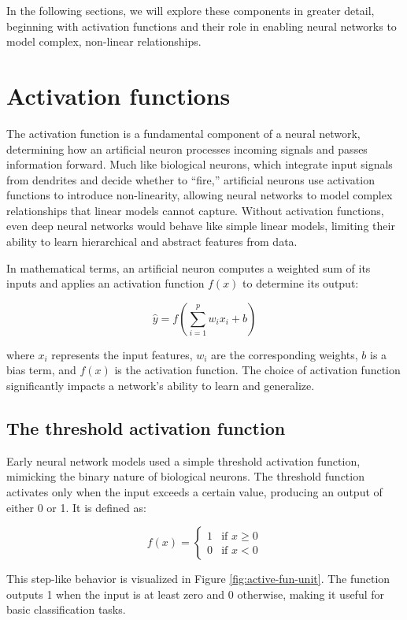 \documentclass[
  11pt,
]{book}
\theoremstyle{definition}
\theoremstyle{definition}
\theoremstyle{definition}
\theoremstyle{definition}
\theoremstyle{remark}
\begin{document}
In the following sections, we will explore these components in greater detail, beginning with activation functions and their role in enabling neural networks to model complex, non-linear relationships.

\section{Activation functions}\label{activation-functions}

The activation function is a fundamental component of a neural network, determining how an artificial neuron processes incoming signals and passes information forward. Much like biological neurons, which integrate input signals from dendrites and decide whether to ``fire,'' artificial neurons use activation functions to introduce non-linearity, allowing neural networks to model complex relationships that linear models cannot capture. Without activation functions, even deep neural networks would behave like simple linear models, limiting their ability to learn hierarchical and abstract features from data.

In mathematical terms, an artificial neuron computes a weighted sum of its inputs and applies an activation function \(f(x)\) to determine its output:

\[
\hat{y} = f\left( \sum_{i=1}^{p} w_i x_i + b \right)
\]

where \(x_i\) represents the input features, \(w_i\) are the corresponding weights, \(b\) is a bias term, and \(f(x)\) is the activation function. The choice of activation function significantly impacts a network's ability to learn and generalize.

\subsection*{The threshold activation function}\label{the-threshold-activation-function}


Early neural network models used a simple threshold activation function, mimicking the binary nature of biological neurons. The threshold function activates only when the input exceeds a certain value, producing an output of either 0 or 1. It is defined as:

\[
f(x) = 
\begin{cases} 
1 & \text{if } x \geq 0 \\ 
0 & \text{if } x < 0
\end{cases}
\]

This step-like behavior is visualized in Figure \ref{fig:active-fun-unit}. The function outputs 1 when the input is at least zero and 0 otherwise, making it useful for basic classification tasks.
\end{document}
